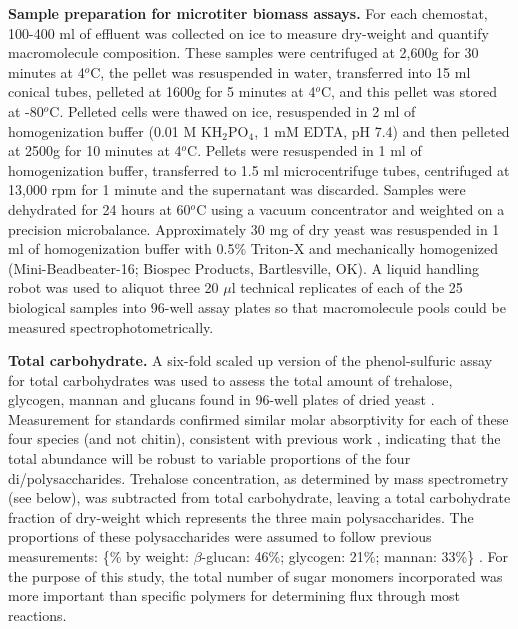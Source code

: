 \textbf{Sample preparation for microtiter biomass assays.} For each chemostat, 100-400 ml of effluent was collected on ice to measure dry-weight and quantify macromolecule composition. These samples were centrifuged at 2,600g for 30 minutes at 4$^{o}$C, the pellet was resuspended in water, transferred into 15 ml conical tubes, pelleted at 1600g for 5 minutes at 4$^{o}$C, and this pellet was stored at -80$^{o}$C.  Pelleted cells were thawed on ice, resuspended in 2 ml of homogenization buffer (0.01 M KH$_{2}$PO$_{4}$, 1 mM EDTA, pH 7.4) and then pelleted at 2500g for 10 minutes at 4$^{o}$C.  Pellets were resuspended in 1 ml of homogenization buffer, transferred to 1.5 ml microcentrifuge tubes, centrifuged at 13,000 rpm for 1 minute and the supernatant was discarded.  Samples were dehydrated for 24 hours at 60$^{o}$C using a vacuum concentrator and weighted on a precision microbalance. Approximately 30 mg of dry yeast was resuspended in 1 ml of homogenization buffer with 0.5\% Triton-X and mechanically homogenized (Mini-Beadbeater-16; Biospec Products, Bartlesville, OK).  A liquid handling robot was used to aliquot three 20 $\mu$l technical replicates of each of the 25 biological samples into 96-well assay plates so that macromolecule pools could be measured spectrophotometrically.

\textbf{Total carbohydrate.} A six-fold scaled up version of the phenol-sulfuric assay for total carbohydrates was used to assess the total amount of trehalose, glycogen, mannan and glucans found in 96-well plates of dried yeast \cite{Masuko:2005fy}.  Measurement for standards confirmed similar molar absorptivity for each of these four species (and not chitin), consistent with previous work \cite{Masuko:2005fy}, indicating that the total abundance will be robust to variable proportions of the four di/polysaccharides.  Trehalose concentration, as determined by mass spectrometry (see below), was subtracted from total carbohydrate, leaving a total carbohydrate fraction of dry-weight which represents the three main polysaccharides.  The proportions of these polysaccharides were assumed to follow previous measurements: \{\% by weight: $\beta$-glucan: 46\%; glycogen: 21\%; mannan: 33\%\} \cite{Herrgard:2008gb}.  For the purpose of this study, the total number of sugar monomers incorporated was more important than specific polymers for determining flux through most reactions.  

